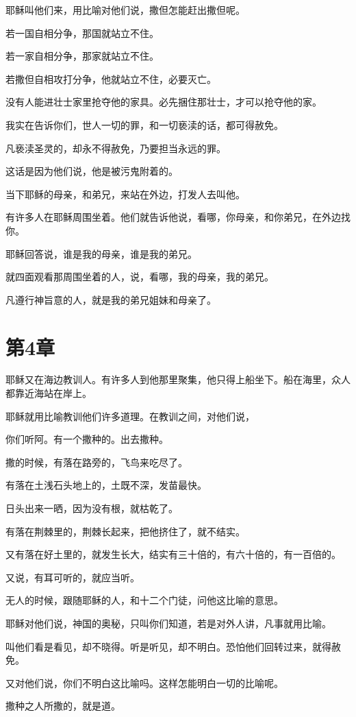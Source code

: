 \documentclass[12pt,oneside]{book}
\begin{document}
耶稣叫他们来，用比喻对他们说，撒但怎能赶出撒但呢。

若一国自相分争，那国就站立不住。

若一家自相分争，那家就站立不住。

若撒但自相攻打分争，他就站立不住，必要灭亡。

没有人能进壮士家里抢夺他的家具。必先捆住那壮士，才可以抢夺他的家。

我实在告诉你们，世人一切的罪，和一切亵渎的话，都可得赦免。

凡亵渎圣灵的，却永不得赦免，乃要担当永远的罪。

这话是因为他们说，他是被污鬼附着的。

当下耶稣的母亲，和弟兄，来站在外边，打发人去叫他。

有许多人在耶稣周围坐着。他们就告诉他说，看哪，你母亲，和你弟兄，在外边找你。

耶稣回答说，谁是我的母亲，谁是我的弟兄。

就四面观看那周围坐着的人，说，看哪，我的母亲，我的弟兄。

凡遵行神旨意的人，就是我的弟兄姐妹和母亲了。

\chapter{第4章}
耶稣又在海边教训人。有许多人到他那里聚集，他只得上船坐下。船在海里，众人都靠近海站在岸上。

耶稣就用比喻教训他们许多道理。在教训之间，对他们说，

你们听阿。有一个撒种的。出去撒种。

撒的时候，有落在路旁的，飞鸟来吃尽了。

有落在土浅石头地上的，土既不深，发苗最快。

日头出来一晒，因为没有根，就枯乾了。

有落在荆棘里的，荆棘长起来，把他挤住了，就不结实。

又有落在好土里的，就发生长大，结实有三十倍的，有六十倍的，有一百倍的。

又说，有耳可听的，就应当听。

无人的时候，跟随耶稣的人，和十二个门徒，问他这比喻的意思。

耶稣对他们说，神国的奥秘，只叫你们知道，若是对外人讲，凡事就用比喻。

叫他们看是看见，却不晓得。听是听见，却不明白。恐怕他们回转过来，就得赦免。

又对他们说，你们不明白这比喻吗。这样怎能明白一切的比喻呢。

撒种之人所撒的，就是道。
\end{document}
